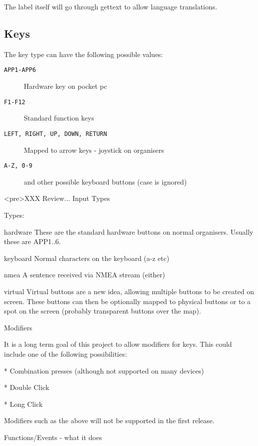 The label itself will go through gettext to allow language
translations.

\subsection{Keys}

The key type can have the following possible values:

\begin{description}
\item[\texttt{APP1-APP6}] Hardware key on pocket pc
\item[\texttt{F1-F12}] Standard function keys
\item[\texttt{LEFT, RIGHT, UP, DOWN, RETURN}] Mapped to arrow keys - joystick on
  organisers
\item[\texttt{A-Z, 0-9}] and other possible keyboard buttons (case is ignored)
\end{description}


<pre>XXX Review...
				Input Types

				Types:

				hardware	These are the standard hardware buttons
				on normal organisers. Usually these are
				APP1..6.

				keyboard	Normal characters on the keyboard (a-z etc)

				nmea		A sentence received via NMEA stream (either)

				virtual		Virtual buttons are a new idea, allowing
				multiple buttons to be created on screen.
				These buttons can then be optionally mapped
				to physical buttons or to a spot on the
				screen (probably transparent buttons over
				the map).

				Modifiers

				It is a long term goal of this project to allow modifiers for keys.
				This could include one of the following possibilities:

				* Combination presses (although not supported on many devices)

				* Double Click

				* Long Click

				Modifiers such as the above will not be supported in the first release.

				Functions/Events - what it does

